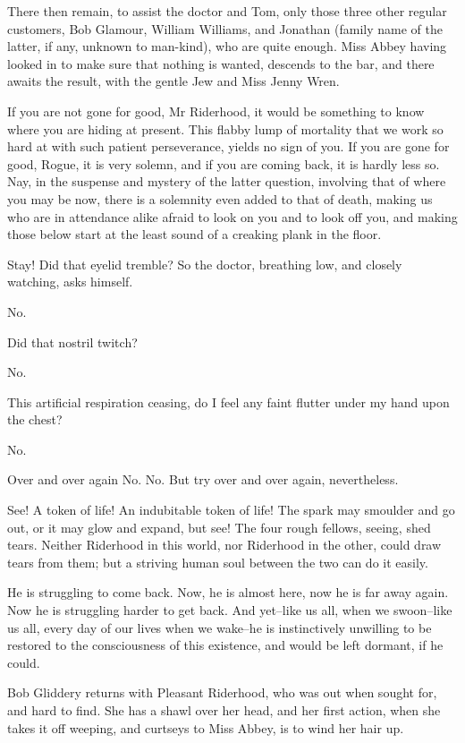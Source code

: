 There then remain, to assist the doctor and Tom, only those three other
regular customers, Bob Glamour, William Williams, and Jonathan (family
name of the latter, if any, unknown to man-kind), who are quite enough.
Miss Abbey having looked in to make sure that nothing is wanted,
descends to the bar, and there awaits the result, with the gentle Jew
and Miss Jenny Wren.

If you are not gone for good, Mr Riderhood, it would be something to
know where you are hiding at present. This flabby lump of mortality that
we work so hard at with such patient perseverance, yields no sign of
you. If you are gone for good, Rogue, it is very solemn, and if you are
coming back, it is hardly less so. Nay, in the suspense and mystery of
the latter question, involving that of where you may be now, there is a
solemnity even added to that of death, making us who are in attendance
alike afraid to look on you and to look off you, and making those below
start at the least sound of a creaking plank in the floor.

Stay! Did that eyelid tremble? So the doctor, breathing low, and closely
watching, asks himself.

No.

Did that nostril twitch?

No.

This artificial respiration ceasing, do I feel any faint flutter under
my hand upon the chest?

No.

Over and over again No. No. But try over and over again, nevertheless.

See! A token of life! An indubitable token of life! The spark may
smoulder and go out, or it may glow and expand, but see! The four
rough fellows, seeing, shed tears. Neither Riderhood in this world, nor
Riderhood in the other, could draw tears from them; but a striving human
soul between the two can do it easily.

He is struggling to come back. Now, he is almost here, now he is far
away again. Now he is struggling harder to get back. And yet--like us
all, when we swoon--like us all, every day of our lives when we wake--he
is instinctively unwilling to be restored to the consciousness of this
existence, and would be left dormant, if he could.

Bob Gliddery returns with Pleasant Riderhood, who was out when sought
for, and hard to find. She has a shawl over her head, and her first
action, when she takes it off weeping, and curtseys to Miss Abbey, is to
wind her hair up.

